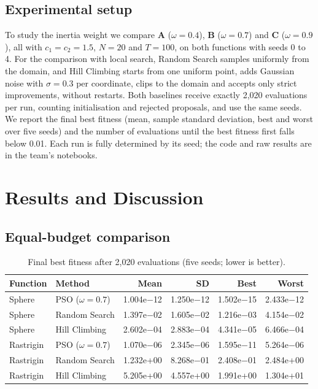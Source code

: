 \documentclass[11pt,a4paper]{article}
\begin{document}
\subsection{Experimental setup}
To study the inertia weight we compare \textbf{A} ($\omega=0.4$), \textbf{B} ($\omega=0.7$) and \textbf{C} ($\omega=0.9$), all with $c_1=c_2=1.5$, $N=20$ and $T=100$, on both functions with seeds 0 to 4. For the comparison with local search, Random Search samples uniformly from the domain, and Hill Climbing starts from one uniform point, adds Gaussian noise with $\sigma=0.3$ per coordinate, clips to the domain and accepts only strict improvements, without restarts. Both baselines receive exactly 2,020 evaluations per run, counting initialisation and rejected proposals, and use the same seeds. We report the final best fitness (mean, sample standard deviation, best and worst over five seeds) and the number of evaluations until the best fitness first falls below 0.01. Each run is fully determined by its seed; the code and raw results are in the team's notebooks.

\section{Results and Discussion}\label{sec:results}

\subsection{Equal-budget comparison}
\begin{table}[ht]
\centering
\caption{Final best fitness after 2,020 evaluations (five seeds; lower is better).}\label{tab:final}
\small
\begin{tabular}{@{}llrrrr@{}}
\toprule
\textbf{Function} & \textbf{Method} & \textbf{Mean} & \textbf{SD} & \textbf{Best} & \textbf{Worst}\\
\midrule
Sphere & PSO ($\omega=0.7$) & 1.004e$-$12 & 1.250e$-$12 & 1.502e$-$15 & 2.433e$-$12\\
Sphere & Random Search & 1.397e$-$02 & 1.605e$-$02 & 1.216e$-$03 & 4.154e$-$02\\
Sphere & Hill Climbing & 2.602e$-$04 & 2.883e$-$04 & 4.341e$-$05 & 6.466e$-$04\\
Rastrigin & PSO ($\omega=0.7$) & 1.070e$-$06 & 2.345e$-$06 & 1.595e$-$11 & 5.264e$-$06\\
Rastrigin & Random Search & 1.232e+00 & 8.268e$-$01 & 2.408e$-$01 & 2.484e+00\\
Rastrigin & Hill Climbing & 5.205e+00 & 4.557e+00 & 1.991e+00 & 1.304e+01\\
\bottomrule
\end{tabular}
\end{table}
\end{document}
